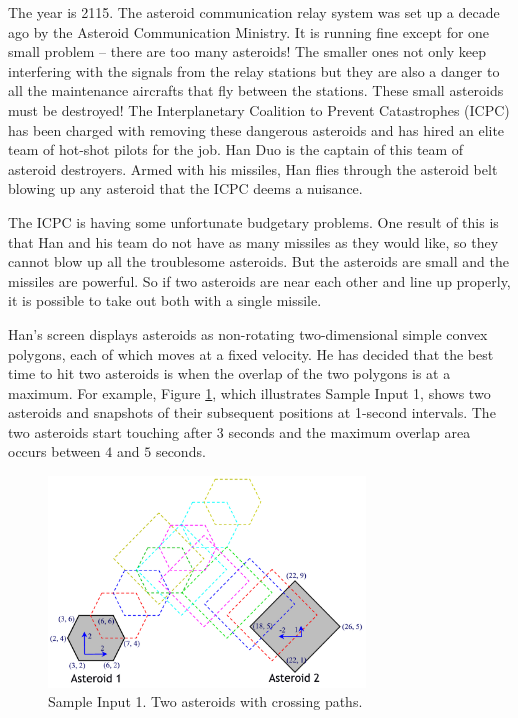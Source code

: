 
The year is 2115. The asteroid communication relay system was set up a decade ago by the Asteroid Communication Ministry. It is running fine except for one small problem -- there are too many asteroids! The smaller ones not only keep interfering with the signals from the relay stations but they are also a danger to all the maintenance aircrafts that fly between the stations. These small asteroids must be destroyed! The Interplanetary Coalition to Prevent Catastrophes (ICPC) has been charged with removing these dangerous asteroids and has hired an elite team of hot-shot pilots for the job. Han Duo is the captain of this team of asteroid destroyers. Armed with his missiles, Han flies through the asteroid belt blowing up any asteroid that the ICPC deems a nuisance.

The ICPC is having some unfortunate budgetary problems. One result of this is that Han and his team do not have as many missiles as they would like, so they cannot blow up all the troublesome asteroids.
But the asteroids are small and the missiles are powerful.   So if two asteroids are near each other and line up properly, it is possible to take out both with a single missile.

Han's screen displays asteroids as non-rotating two-dimensional simple convex polygons, each of which moves at a fixed velocity. He has decided that the best time to hit two asteroids is
when the overlap of the two polygons is at a maximum. For example, Figure
\ref{fig:asteroid}, which illustrates Sample Input 1,
shows two asteroids and snapshots of their subsequent positions at 1-second intervals.  
The two asteroids start touching after $3$ seconds and the maximum overlap area occurs between $4$ and $5$ seconds.

\begin{figure}[!h]
\centering
\includegraphics[width=0.75\textwidth]{asteroid.png}
\caption{Sample Input 1. Two asteroids with crossing paths.}
\label{fig:asteroid}
\end{figure}

